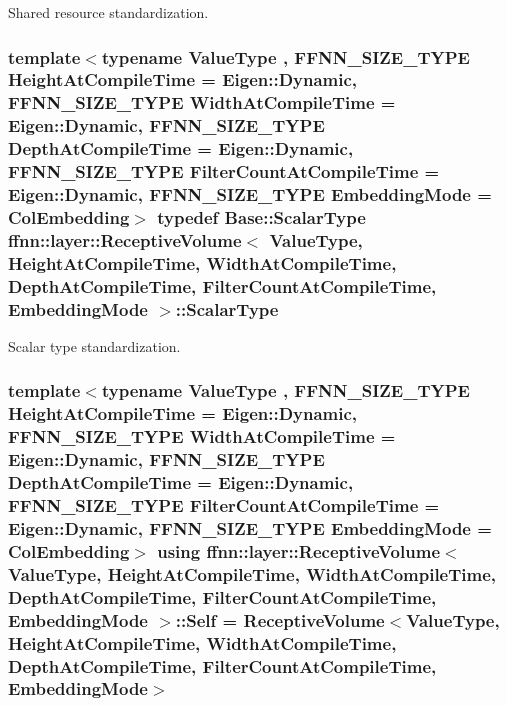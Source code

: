 Shared resource standardization. 

\hypertarget{classffnn_1_1layer_1_1_receptive_volume_a4b3e846caf0136f173b3e0ceff912eac}{
\subsubsection[{Scalar\-Type}]{\setlength{\rightskip}{0pt plus 5cm}template$<$typename Value\-Type , F\-F\-N\-N\-\_\-\-S\-I\-Z\-E\-\_\-\-T\-Y\-P\-E Height\-At\-Compile\-Time = Eigen\-::\-Dynamic, F\-F\-N\-N\-\_\-\-S\-I\-Z\-E\-\_\-\-T\-Y\-P\-E Width\-At\-Compile\-Time = Eigen\-::\-Dynamic, F\-F\-N\-N\-\_\-\-S\-I\-Z\-E\-\_\-\-T\-Y\-P\-E Depth\-At\-Compile\-Time = Eigen\-::\-Dynamic, F\-F\-N\-N\-\_\-\-S\-I\-Z\-E\-\_\-\-T\-Y\-P\-E Filter\-Count\-At\-Compile\-Time = Eigen\-::\-Dynamic, F\-F\-N\-N\-\_\-\-S\-I\-Z\-E\-\_\-\-T\-Y\-P\-E Embedding\-Mode = Col\-Embedding$>$ typedef {\bf Base\-::\-Scalar\-Type} {\bf ffnn\-::layer\-::\-Receptive\-Volume}$<$ Value\-Type, Height\-At\-Compile\-Time, Width\-At\-Compile\-Time, Depth\-At\-Compile\-Time, Filter\-Count\-At\-Compile\-Time, {\bf Embedding\-Mode} $>$\-::{\bf Scalar\-Type}}}\label{classffnn_1_1layer_1_1_receptive_volume_a4b3e846caf0136f173b3e0ceff912eac}


Scalar type standardization. 

\hypertarget{classffnn_1_1layer_1_1_receptive_volume_a109443dccd1eddb55aec1b2810030606}{
\subsubsection[{Self}]{\setlength{\rightskip}{0pt plus 5cm}template$<$typename Value\-Type , F\-F\-N\-N\-\_\-\-S\-I\-Z\-E\-\_\-\-T\-Y\-P\-E Height\-At\-Compile\-Time = Eigen\-::\-Dynamic, F\-F\-N\-N\-\_\-\-S\-I\-Z\-E\-\_\-\-T\-Y\-P\-E Width\-At\-Compile\-Time = Eigen\-::\-Dynamic, F\-F\-N\-N\-\_\-\-S\-I\-Z\-E\-\_\-\-T\-Y\-P\-E Depth\-At\-Compile\-Time = Eigen\-::\-Dynamic, F\-F\-N\-N\-\_\-\-S\-I\-Z\-E\-\_\-\-T\-Y\-P\-E Filter\-Count\-At\-Compile\-Time = Eigen\-::\-Dynamic, F\-F\-N\-N\-\_\-\-S\-I\-Z\-E\-\_\-\-T\-Y\-P\-E Embedding\-Mode = Col\-Embedding$>$ using {\bf ffnn\-::layer\-::\-Receptive\-Volume}$<$ Value\-Type, Height\-At\-Compile\-Time, Width\-At\-Compile\-Time, Depth\-At\-Compile\-Time, Filter\-Count\-At\-Compile\-Time, {\bf Embedding\-Mode} $>$\-::{\bf Self} =  {\bf Receptive\-Volume}$<$Value\-Type, Height\-At\-Compile\-Time, Width\-At\-Compile\-Time, Depth\-At\-Compile\-Time, Filter\-Count\-At\-Compile\-Time, {\bf Embedding\-Mode}$>$}}\label{classffnn_1_1layer_1_1_receptive_volume_a109443dccd1eddb55aec1b2810030606}



